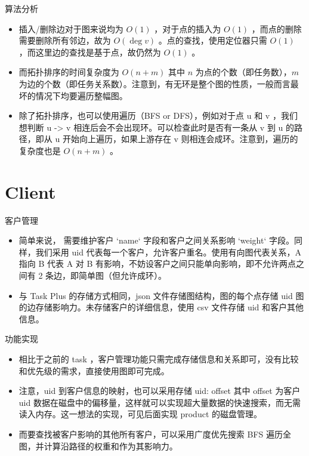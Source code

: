 \documentclass{beamer}
\begin{document}
\begin{frame}{算法分析}
\begin{itemize}
\item 插入/删除边对于图来说均为 $O(1)$ ，对于点的插入为 $O(1)$ ，而点的删除需要删除所有邻边，故为 $O(\deg v)$ 。点的查找，使用定位器只需 $O(1)$ ，而这里边的查找是基于点，故仍然为 $O(1)$ 。
\item 而拓扑排序的时间复杂度为 $O(n+m)$ 其中 $n$ 为点的个数（即任务数），$m$ 为边的个数（即任务关系数）。注意到，有无环是整个图的性质，一般而言最坏的情况下均要遍历整幅图。
\item 除了拓扑排序，也可以使用遍历（BFS or DFS），例如对于点 u 和 v ，我们想判断 u -> v 相连后会不会出现环。可以检查此时是否有一条从 v 到 u 的路径，即从 u 开始向上遍历，如果上游存在 v 则相连会成环。注意到，遍历的复杂度也是 $O(n+m)$ 。
\end{itemize}
\end{frame}


\section{Client}


\begin{frame}{客户管理}
\begin{itemize}
\item 简单来说， 需要维护客户 `name` 字段和客户之间关系影响 `weight` 字段。同样，我们采用 uid 代表每一个客户，允许客户重名。使用有向图代表关系，A 指向 B 代表 A 对 B 有影响，不妨设客户之间只能单向影响，即不允许两点之间有 2 条边，即简单图（但允许成环）。
\item 与 Task Plus 的存储方式相同，json 文件存储图结构，图的每个点存储 uid 图的边存储影响力。未存储客户的详细信息，使用 csv 文件存储 uid 和客户其他信息。
\end{itemize}
\end{frame}


\begin{frame}{功能实现}
\begin{itemize}
\item 相比于之前的 task ，客户管理功能只需完成存储信息和关系即可，没有比较和优先级的需求，直接使用图即可完成。
\item 注意，uid 到客户信息的映射，也可以采用存储 uid: offset 其中 offset 为客户 uid 数据在磁盘中的偏移量，这样就可以实现超大量数据的快速搜索，而无需读入内存。这一想法的实现，可见后面实现 product 的磁盘管理。
\item 而要查找被客户影响的其他所有客户，可以采用广度优先搜索 BFS 遍历全图，并计算沿路径的权重和作为其影响力。
\end{itemize}
\end{frame}
\end{document}
